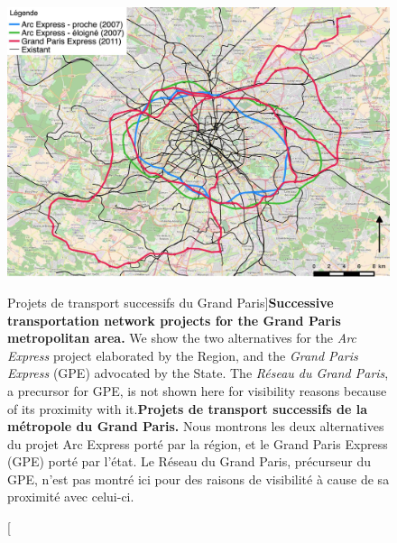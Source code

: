 {}



\begin{figure}
\includegraphics[width=\textwidth]{Figures/Final/1-2-1-fig-casestudies-projects.jpg}
\caption[][Projets de transport successifs du Grand Paris]{\textbf{Successive transportation network projects for the Grand Paris metropolitan area.} We show the two alternatives for the \emph{Arc Express} project elaborated by the Region, and the \emph{Grand Paris Express} (GPE) advocated by the State. The \emph{Réseau du Grand Paris}, a precursor for GPE, is not shown here for visibility reasons because of its proximity with it.\label{fig:projects}}{\textbf{Projets de transport successifs de la métropole du Grand Paris.} Nous montrons les deux alternatives du projet Arc Express porté par la région, et le Grand Paris Express (GPE) porté par l'état. Le Réseau du Grand Paris, précurseur du GPE, n'est pas montré ici pour des raisons de visibilité à cause de sa proximité avec celui-ci.\label{fig:casestudies:projects}}
\end{figure}


